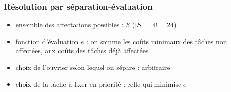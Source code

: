 \documentclass{beamer}
\begin{document}
\begin{frame}
  \frametitle{Résolution par séparation-évaluation}

  \begin{itemize}
    \item ensemble des affectations possibles : $S$ ($|S| = 4! = 24$) 
    \item fonction d'évaluation $e$ : on somme les coûts minimaux des tâches non affectées, aux coûts des tâches déjà affectées
    \item choix de l'ouvrier selon lequel on sépare : arbitraire %
    \item choix de la tâche à fixer en priorité : celle qui minimise $e$ %
  \end{itemize}
\end{frame}
\end{document}
